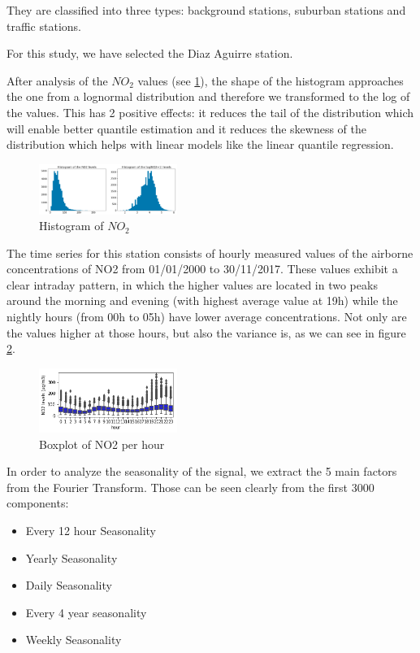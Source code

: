 \documentclass[a4paper,twocolumn,5p]{elsarticle}
\begin{document}
They are classified into 
three types: background stations, suburban stations 
and traffic stations. 

For this study, we have selected the Diaz Aguirre station.

After analysis of the $NO_2$ values (see \ref{figure:histo_no2}), the shape 
of the histogram approaches the one from a lognormal distribution 
and therefore we transformed to 
the log of the values. This has 2 positive effects: it reduces the tail of the 
distribution which will enable better quantile estimation and it reduces the 
skewness of the distribution 
which helps with linear models like the linear quantile regression.

\begin{figure}
  \centering
  \includegraphics[width=0.4\textwidth]{histo_no2}
  \caption{Histogram of $NO_2$}
  \label{figure:histo_no2}
\end{figure}

The time series for this station consists of hourly
measured values of the airborne concentrations of NO2
from 01/01/2000 to 30/11/2017. These values exhibit a clear intraday 
pattern, in which the
higher values are located in two peaks around the morning
and evening (with highest average value at 19h) while the 
nightly hours (from 00h to 05h) have lower average concentrations. 
Not only are the values higher at those hours, but also
the variance is, as we can see in figure \ref{figure:variance}. 
 
\begin{figure}
  \centering
      \includegraphics[width=0.4\textwidth]{NO2Var}
  \caption{Boxplot of NO2 per hour}
\label{figure:variance}
\end{figure}

In order to analyze the seasonality of the signal, we extract the 5 main factors 
from the Fourier Transform. Those can be seen clearly from the first 3000 components:

\begin{itemize}
  \item Every 12 hour Seasonality
  \item Yearly Seasonality
  \item Daily Seasonality
  \item Every 4 year seasonality
  \item Weekly Seasonality
\end{itemize} 
\end{document}
